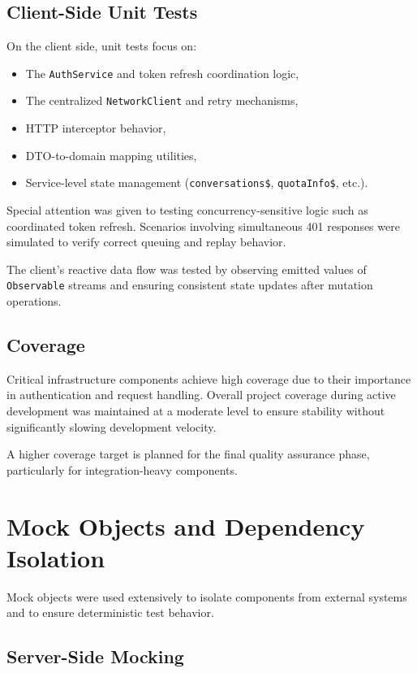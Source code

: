 \subsection{Client-Side Unit Tests}

On the client side, unit tests focus on:

\begin{itemize}
    \item The \texttt{AuthService} and token refresh coordination logic,
    \item The centralized \texttt{NetworkClient} and retry mechanisms,
    \item HTTP interceptor behavior,
    \item DTO-to-domain mapping utilities,
    \item Service-level state management (\texttt{conversations\$}, \texttt{quotaInfo\$}, etc.).
\end{itemize}

Special attention was given to testing concurrency-sensitive logic such as coordinated token refresh. Scenarios involving simultaneous 401 responses were simulated to verify correct queuing and replay behavior.

The client’s reactive data flow was tested by observing emitted values of \texttt{Observable} streams and ensuring consistent state updates after mutation operations.

\subsection{Coverage}

Critical infrastructure components achieve high coverage due to their importance in authentication and request handling. Overall project coverage during active development was maintained at a moderate level to ensure stability without significantly slowing development velocity.

A higher coverage target is planned for the final quality assurance phase, particularly for integration-heavy components.

\section{Mock Objects and Dependency Isolation}

Mock objects were used extensively to isolate components from external systems and to ensure deterministic test behavior.

\subsection{Server-Side Mocking}


